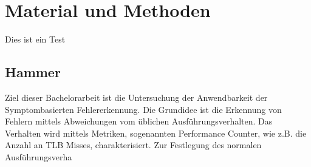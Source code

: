 \chapter{Material und Methoden}
Dies ist ein Test


\section{Hammer}

Ziel dieser Bachelorarbeit ist die Untersuchung der Anwendbarkeit der Symptombasierten
Fehlererkennung.
Die Grundidee ist die Erkennung von Fehlern mittels Abweichungen vom üblichen
Ausführungsverhalten. Das Verhalten wird mittels Metriken, sogenannten Performance Counter,
wie z.B. die Anzahl an TLB Misses, charakterisiert. Zur Festlegung des normalen
Ausführungsverha